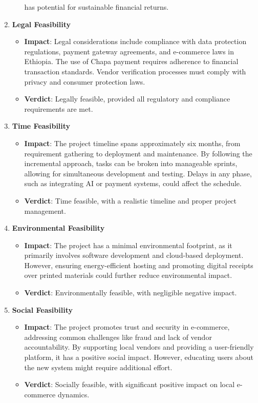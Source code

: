 \documentclass[12pt]{report}
\begin{document}
\begin{enumerate}
\begin{itemize}
		            has potential for sustainable financial returns.
	      \end{itemize}
	\item \textbf{Legal Feasibility}
	      \begin{itemize}
		      \item \textbf{Impact}: Legal considerations include compliance with data protection
		            regulations, payment gateway agreements, and e-commerce laws in Ethiopia.
		            The use of Chapa payment requires adherence to financial transaction
		            standards. Vendor verification processes must comply with privacy and
		            consumer protection laws.
		      \item \textbf{Verdict}: Legally feasible, provided all regulatory and compliance
		            requirements are met.
	      \end{itemize}
	\item \textbf{Time Feasibility}
	      \begin{itemize}
		      \item \textbf{Impact}: The project timeline spans approximately six months, from
		            requirement gathering to deployment and maintenance. By following the
		            incremental approach, tasks can be broken into manageable sprints, allowing
		            for simultaneous development and testing. Delays in any phase, such as
		            integrating AI or payment systems, could affect the schedule.
		      \item \textbf{Verdict}: Time feasible, with a realistic timeline and proper project
		            management.
	      \end{itemize}
	\item \textbf{Environmental Feasibility}
	      \begin{itemize}
		      \item \textbf{Impact}: The project has a minimal environmental footprint, as it primarily
		            involves software development and cloud-based deployment. However,
		            ensuring energy-efficient hosting and promoting digital receipts over printed
		            materials could further reduce environmental impact.
		      \item \textbf{Verdict}: Environmentally feasible, with negligible negative impact.
	      \end{itemize}
	\item \textbf{Social Feasibility}
	      \begin{itemize}
		      \item \textbf{Impact}: The project promotes trust and security in e-commerce, addressing
		            common challenges like fraud and lack of vendor accountability. By
		            supporting local vendors and providing a user-friendly platform, it has a
		            positive social impact. However, educating users about the new system might
		            require additional effort.
		      \item \textbf{Verdict}: Socially feasible, with significant positive impact on local
		            e-commerce dynamics.
	      \end{itemize}
\end{enumerate}
\end{document}
